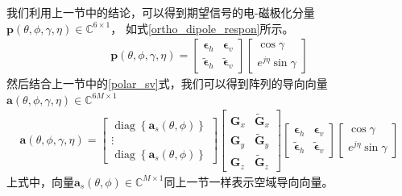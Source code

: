 \documentclass[master]{thesis-uestc}
\begin{document}
我们利用上一节中的结论，可以得到期望信号的电-磁极化分量$\bm{p}(\theta,\phi,\gamma,\eta)\in\mathbb{C}^{6\times1}$，
如式\eqref{ortho_dipole_respon}所示。
\begin{equation}\label{ortho_dipole_respon}
    \begin{aligned}
        \bm{p}(\theta,\phi,\gamma,\eta) = 
        \begin{bmatrix}
            \bm{\epsilon}_h & \bm{\epsilon}_v \\
            \tilde{\bm{\epsilon}}_h & \tilde{\bm{\epsilon}}_v
        \end{bmatrix}
        \begin{bmatrix}
            \cos\gamma \\ e^{j\eta}\sin\gamma
        \end{bmatrix}
    \end{aligned}
\end{equation}
然后结合上一节中的\eqref{polar_sv}式，我们可以得到阵列的导向向量$\bm{a}(\theta,\phi,\gamma,\eta)\in\mathbb{C}^{6M\times1}$
\begin{equation}\label{polar_ortho_sv_comp}
    \begin{aligned}
        \bm{a}(\theta,\phi,\gamma,\eta) = 
        \begin{bmatrix}
            \operatorname{diag}\left\{\bm{a}_s(\theta,\phi)\right\} \\
            \vdots \\
            \operatorname{diag}\left\{\bm{a}_s(\theta,\phi)\right\}
        \end{bmatrix}
        \begin{bmatrix}
            \bm{G}_x & \tilde{\bm{G}}_x \\
            \bm{G}_y & \tilde{\bm{G}}_y \\
            \bm{G}_z & \tilde{\bm{G}}_z
        \end{bmatrix}
        \begin{bmatrix}
            \bm{\epsilon}_h & \bm{\epsilon}_v \\
            \tilde{\bm{\epsilon}}_h & \tilde{\bm{\epsilon}}_v
        \end{bmatrix}
        \begin{bmatrix}
            \cos\gamma \\ e^{j\eta}\sin\gamma
        \end{bmatrix}
    \end{aligned}
\end{equation}
上式中，向量$\bm{a}_s(\theta,\phi)\in\mathbb{C}^{M\times1}$同上一节一样表示空域导向向量。
\end{document}
